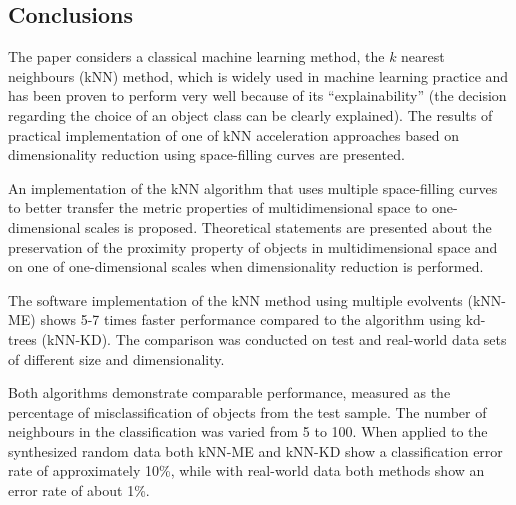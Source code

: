 \documentclass[entropy,article,submit,moreauthors,pdftex]{Definitions/mdpi}
\begin{document}
\begin{paracol}{2}
\section{Conclusions}\label{conclusions}

The paper considers a classical machine learning method, the $k$ nearest neighbours (kNN) method, which is widely used in machine learning practice and has been proven to perform very well because of its ``explainability'' (the decision  regarding the choice of an object class can be clearly explained). The results of practical implementation of one of kNN acceleration approaches based on dimensionality reduction using space-filling curves are presented.

An implementation of the kNN algorithm that uses multiple space-filling curves to better transfer the metric properties of multidimensional space to one-dimensional scales is proposed. Theoretical statements are presented about the preservation of the proximity property of objects in multidimensional space and on one of one-dimensional scales when dimensionality reduction is performed.

The software implementation of the kNN method using multiple evolvents (kNN-ME) shows 5-7 times faster performance compared to the algorithm using kd-trees (kNN-KD). The comparison was conducted on test and real-world data sets of different size and dimensionality. 

Both algorithms demonstrate comparable performance, measured as the percentage of misclassification of objects from the test sample. The number of neighbours in the classification was varied from 5 to 100. When applied to the synthesized random data both kNN-ME and kNN-KD show a classification error rate of approximately 10\%, while with real-world data both methods show an error rate of about 1\%.





\vspace{6pt} 



\end{paracol}
\end{document}
